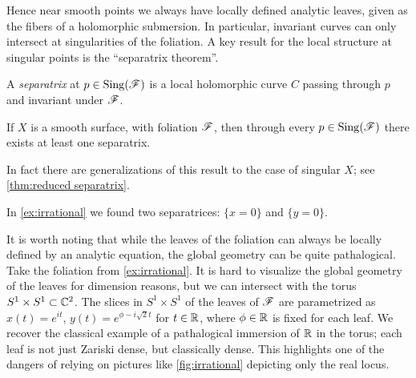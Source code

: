 Hence near smooth points we always have locally defined analytic leaves, given
as the fibers of a holomorphic submersion. In particular, invariant curves can
only intersect at singularities of the foliation. A key result for the local
structure at singular points is the ``separatrix theorem''.

\begin{definition}
    A \emph{separatrix} at $p\in\operatorname{Sing}(\mathscr{F})$ is a local holomorphic curve $C$
    passing through $p$ and invariant under $\mathscr{F}$.
\end{definition}

\begin{theorem}\label{thm:separatrix}
    If $X$ is a smooth surface, with foliation $\mathscr{F}$, then through every
    $p\in\operatorname{Sing}(\mathscr{F})$ there exists at least one separatrix.
\end{theorem}

In fact there are generalizations of this result to the case of singular $X$;
see \cref{thm:reduced separatrix}.

\begin{example}
    In \cref{ex:irrational} we found two separatrices: $\{x=0\}$ and
    $\{y=0\}$.
\end{example}

It is worth noting that while the leaves of the foliation can always be locally
defined by an analytic equation, the global geometry can be quite pathalogical.
Take the foliation from \cref{ex:irrational}. It is hard to visualize the global
geometry of the leaves for dimension reasons, but we can intersect with the
torus $S^1\times S^1\subset\mathbb{C}^2$. The slices in $S^1\times S^1$ of the leaves of
$\mathscr{F}$ are parametrized as $x(t)=e^{it}$, $y(t)=e^{\phi-i\sqrt2t}$ for
$t\in\mathbb{R}$, where $\phi\in\mathbb{R}$ is fixed for each leaf. We recover the classical
example of a pathalogical immersion of $\mathbb{R}$ in the torus; each leaf is not just
Zariski dense, but classically dense. This highlights one of the dangers of
relying on pictures like \cref{fig:irrational} depicting only the real locus.

